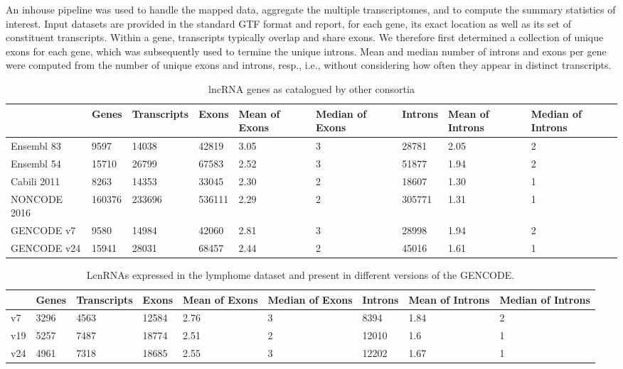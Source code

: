 \documentclass[ncrna,article,submit,moreauthors,pdftex,10pt,a4paper]{mdpi}
\begin{document}
An inhouse pipeline was used to handle the mapped data, aggregate the
multiple transcriptomes, and to compute the summary statistics of
interest. Input datasets are provided in the standard GTF format and
report, for each gene, its exact location as well as its set of constituent
transcripts. Within a gene, transcripts typically overlap and share exons.
We therefore first determined a collection of unique exons for each gene,
which was subsequently used to termine the unique introns. Mean and median
number of introns and exons per gene were computed from the number of
unique exons and introns, resp., i.e., without considering how often they
appear in distinct transcripts. 

\begin{table}[ht]
\caption{lncRNA genes as catalogued by other consortia} 
\begin{center}\tiny
\begin{tabular}[lrrrrrrrr]{p{}|p{}p{}p{}p{}
p{}p{}p{}p{}}
  \hline
 & Genes & Transcripts & Exons & Mean of Exons & Median of Exons & Introns & Mean of Introns & Median of Introns \\ 
   \hline
Ensembl 83 & 9597 & 14038 & 42819 & 3.05 &   3 & 28781 & 2.05 &   2 \\ 
  Ensembl 54 & 15710 & 26799 & 67583 & 2.52 &   3 & 51877 & 1.94 &   2 \\ 
  Cabili 2011 & 8263 & 14353 & 33045 & 2.30 &   2 & 18607 & 1.30 &   1 \\ 
  NONCODE 2016 & 160376 & 233696 & 536111 & 2.29 &   2 & 305771 & 1.31 &   1 \\ 
  GENCODE v7 & 9580 & 14984 & 42060 & 2.81 &   3 & 28998 & 1.94 &   2 \\ 
  GENCODE v24 & 15941 & 28031 & 68457 & 2.44 &   2 & 45016 & 1.61 &   1 \\ 
   \hline
\end{tabular}
\end{center}
\end{table}

\begin{table}[ht]
  \caption{LcnRNAs expressed in the lymphome dataset and present in different
    versions of the GENCODE.}
\label{tab:gencode}
\begin{center}\tiny
\begin{tabular}[lrrrrrrrr]{p{}|p{}p{}p{}p{}
p{}p{}p{}p{}}
  \hline
 & Genes & Transcripts & Exons & Mean of Exons & Median of Exons & Introns & Mean of Introns & Median of Introns \\ 
   \hline
v7 & 3296 & 4563 & 12584 & 2.76 & 3 & 8394 & 1.84 & 2\\
  v19 & 5257 & 7487 & 18774 & 2.51 & 2 & 12010 & 1.6 & 1\\
  v24 & 4961 & 7318 & 18685 & 2.55 & 3 & 12202 & 1.67 & 1\\ 
   \hline
\end{tabular}
\end{center}
\end{table}
\end{document}
